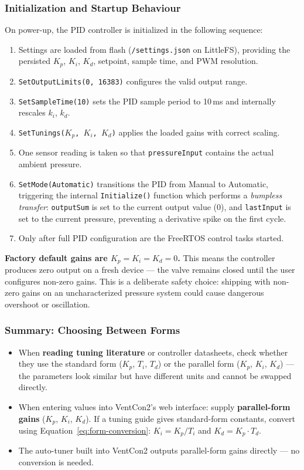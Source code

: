 \subsubsection{Initialization and Startup Behaviour}
\label{sec:pid-init}

On power-up, the PID controller is initialized in the following sequence:

\begin{enumerate}
    \item Settings are loaded from flash (\texttt{/settings.json} on LittleFS), providing the persisted $K_p$, $K_i$, $K_d$, setpoint, sample time, and PWM resolution.
    \item \texttt{SetOutputLimits(0, 16383)} configures the valid output range.
    \item \texttt{SetSampleTime(10)} sets the PID sample period to 10\,ms and internally rescales $k_i$, $k_d$.
    \item \texttt{SetTunings($K_p$, $K_i$, $K_d$)} applies the loaded gains with correct scaling.
    \item One sensor reading is taken so that \texttt{pressureInput} contains the actual ambient pressure.
    \item \texttt{SetMode(Automatic)} transitions the PID from Manual to Automatic, triggering the internal \texttt{Initialize()} function which performs a \emph{bumpless transfer}: \texttt{outputSum} is set to the current output value (0), and \texttt{lastInput} is set to the current pressure, preventing a derivative spike on the first cycle.
    \item Only after full PID configuration are the FreeRTOS control tasks started.
\end{enumerate}

\noindent
\textbf{Factory default gains are $K_p = K_i = K_d = 0$.} This means the controller produces zero output on a fresh device --- the valve remains closed until the user configures non-zero gains. This is a deliberate safety choice: shipping with non-zero gains on an uncharacterized pressure system could cause dangerous overshoot or oscillation.

\subsubsection{Summary: Choosing Between Forms}

\begin{itemize}
    \item When \textbf{reading tuning literature} or controller datasheets, check whether they use the standard form ($K_p$, $T_i$, $T_d$) or the parallel form ($K_p$, $K_i$, $K_d$) --- the parameters look similar but have different units and cannot be swapped directly.
    \item When entering values into VentCon2's web interface: supply \textbf{parallel-form gains} ($K_p$, $K_i$, $K_d$). If a tuning guide gives standard-form constants, convert using Equation~\ref{eq:form-conversion}: $K_i = K_p / T_i$ and $K_d = K_p \cdot T_d$.
    \item The auto-tuner built into VentCon2 outputs parallel-form gains directly --- no conversion is needed.
\end{itemize}

